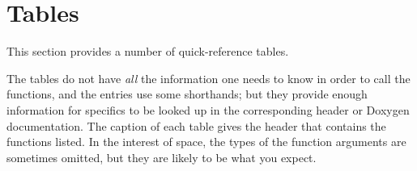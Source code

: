 \section{Tables}
\label{App:Tables}
This section provides a number of quick-reference tables.

The tables do not have \textsl{all} the information one needs to know in
order to call the functions, and the entries use some shorthands; but they
provide enough information for specifics to be looked up in the corresponding
header or Doxygen documentation. The caption of each table gives the header
that contains the functions listed. In the interest of space, the types of
the function arguments are sometimes omitted, but they are likely to be what you
expect.

\listoftables

\clearpage

\setlength{\extrarowheight}{4pt}

